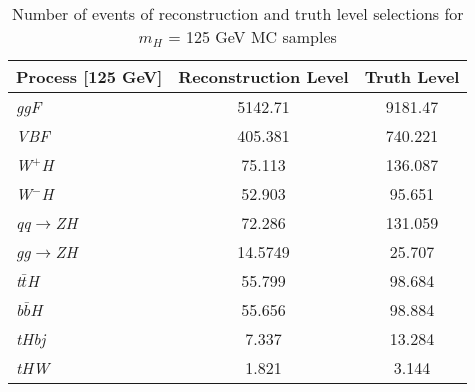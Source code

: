 \documentclass[a4paper, oneside, 11pt, openright]{book}
\begin{document}
 			\begin{table}[tbp]
 				\centering
 				\begin{tabular}{lcc}
 					\toprule[1.5pt]
 					Process	[125 GeV]		& Reconstruction Level	& Truth Level	\\
 					\midrule
 					\textit{ggF}			& 5142.71 				& 9181.47		\\
 					\textit{VBF}			& 405.381 				& 740.221		\\
 					\textit{W$^+$H}			& 75.113 				& 136.087		\\
 					\textit{W$^-$H}			& 52.903 				& 95.651		\\
 					\textit{qq$\to$ZH}		& 72.286				& 131.059		\\
 					\textit{gg$\to$ZH}		& 14.5749 				& 25.707		\\
 					\textit{t$\bar{t}$H}	& 55.799 				& 98.684		\\
 					\textit{b$\bar{b}$H}	& 55.656 				& 98.884		\\
 					\textit{tHbj}			& 7.337 				& 13.284		\\
 					\textit{tHW}			& 1.821 				& 3.144			\\
 					\bottomrule[1.5pt]	
 				\end{tabular}
 				\caption{Number of events of reconstruction and truth level selections for $m_H$ = 125 GeV MC samples}
 			\end{table}	
 			
\end{document}
